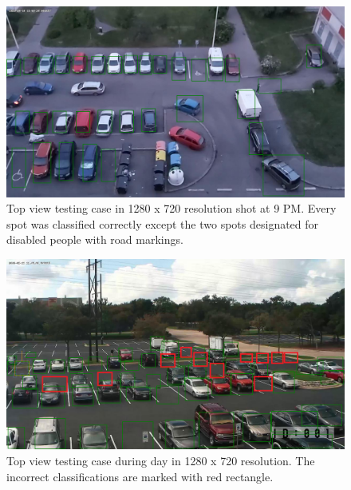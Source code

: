 \documentclass[thesis=M,english]{FITthesis}[2019/03/06]
\begin{document}
\begin{figure}[ht!]
	\centering
	\includegraphics[width=\linewidth]{imgs/test-topview-evening.png}
	\caption{Top view testing case in 1280 x 720 resolution shot at 9 PM. Every spot was classified correctly except the two spots designated for disabled people with road markings.}
	\label{label:test_top_night}
\end{figure}
\begin{figure}[ht!]
	\centering
	\includegraphics[width=\linewidth]{imgs/test-topview-2.png}
	\caption{Top view testing case during day in 1280 x 720 resolution. The incorrect classifications are marked with red rectangle.}
	\label{label:test_top2}
\end{figure}
\end{document}
